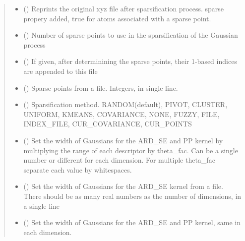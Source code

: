 \documentclass[letterpaper,10pt,english]{sphinxmanual}
\begin{document}
\begin{fulllineitems}
\begin{quote}
\begin{description}
\begin{itemize}
\item {} 
 () \textendash{} Reprints the original xyz file after sparsification process. sparse propery added, true for atoms associated with a sparse point.

\item {} 
 () \textendash{} Number of sparse points to use in the sparsification of the Gaussian process

\item {} 
 () \textendash{} If given, after determinining the sparse points, their 1-based indices are appended to this file

\item {} 
 () \textendash{} Sparse points from a file. Integers, in single line.

\item {} 
 ({\hyperref[\detokenize{descriptors:gap.descriptors.sparse_method}]{}}) \textendash{} Sparsification method. RANDOM(default), PIVOT, CLUSTER, UNIFORM, KMEANS, COVARIANCE, NONE, FUZZY, FILE, INDEX\_FILE, CUR\_COVARIANCE, CUR\_POINTS

\item {} 
 () \textendash{} Set the width of Gaussians for the ARD\_SE and PP kernel by multiplying the range of each descriptor by theta\_fac. Can be a single number or different for each dimension. For multiple theta\_fac separate each value by whitespaces.

\item {} 
 () \textendash{} Set the width of Gaussians for the ARD\_SE kernel from a file. There should be as many real numbers as the number of dimensions, in a single line

\item {} 
 () \textendash{} Set the width of Gaussians for the ARD\_SE and PP kernel, same in each dimension.


\end{itemize}
\end{description}
\end{quote}
\end{fulllineitems}
\end{document}
